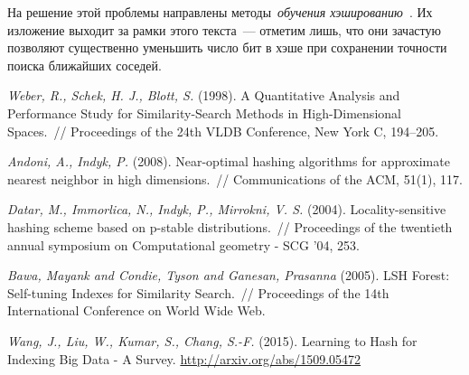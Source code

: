 \documentclass[12pt,fleqn]{article}
\begin{document}
На решение этой проблемы направлены методы~\emph{обучения хэшированию}~\cite{wang15survey}.
Их изложение выходит за рамки этого текста~--- отметим лишь, что они зачастую позволяют
существенно уменьшить число бит в хэше при сохранении точности поиска ближайших соседей.

\begin{thebibliography}{1}
    \emph{Weber, R., Schek, H. J.,  Blott, S.} (1998).
    A Quantitative Analysis and Performance Study for Similarity-Search Methods
    in High-Dimensional Spaces.~// Proceedings of the 24th VLDB Conference, New York C, 194–205.

    \emph{Andoni, A., Indyk, P.} (2008).
    Near-optimal hashing algorithms for approximate nearest neighbor in high dimensions.~//
    Communications of the ACM, 51(1), 117.
    
    \emph{Datar, M., Immorlica, N., Indyk, P., Mirrokni, V. S.} (2004).
    Locality-sensitive hashing scheme based on p-stable distributions.~//
    Proceedings of the twentieth annual symposium on Computational geometry - SCG  ’04, 253.

    \emph{Bawa, Mayank and Condie, Tyson and Ganesan, Prasanna} (2005).
    LSH Forest: Self-tuning Indexes for Similarity Search.~//
    Proceedings of the 14th International Conference on World Wide Web.
    
    \emph{Wang, J., Liu, W., Kumar, S., Chang, S.-F.} (2015).
    Learning to Hash for Indexing Big Data - A Survey. \url{http://arxiv.org/abs/1509.05472}

\end{thebibliography}
\end{document}
